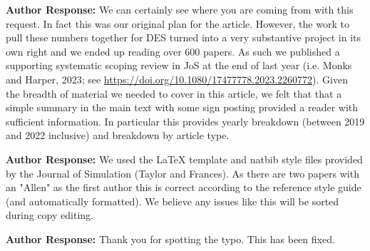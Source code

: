 \documentclass{article}
\begin{document}

\vspace{0.2cm}

\noindent\textbf{Author Response:} We can certainly see where you are coming from with this request. In fact this was our original plan for the article.  However, the work to pull these numbers together for DES turned into a very substantive project in its own right and we ended up reading over 600 papers.  As such we published a supporting systematic scoping review in JoS at the end of last year (i.e. Monks and Harper, 2023; see \url{https://doi.org/10.1080/17477778.2023.2260772}). Given the breadth of material we needed to cover in this article, we felt that that a simple  summary in the main text with some sign posting provided a reader with sufficient information. In particular this provides yearly breakdown (between 2019 and 2022 inclusive) and breakdown by article type.

\vspace{0.5cm}


\vspace{0.2cm}

\noindent\textbf{Author Response:} We used the LaTeX template and natbib style files provided by the Journal of Simulation (Taylor and Frances). As there are two papers with an "Allen" as the first author this is correct according to the reference style guide (and automatically formatted). We believe any issues like this will be sorted during copy editing.

\vspace{0.5cm}


\vspace{0.2cm}

\noindent\textbf{Author Response:} Thank you for spotting the typo. This has been fixed.


\vspace{0.5cm}

\end{document}
